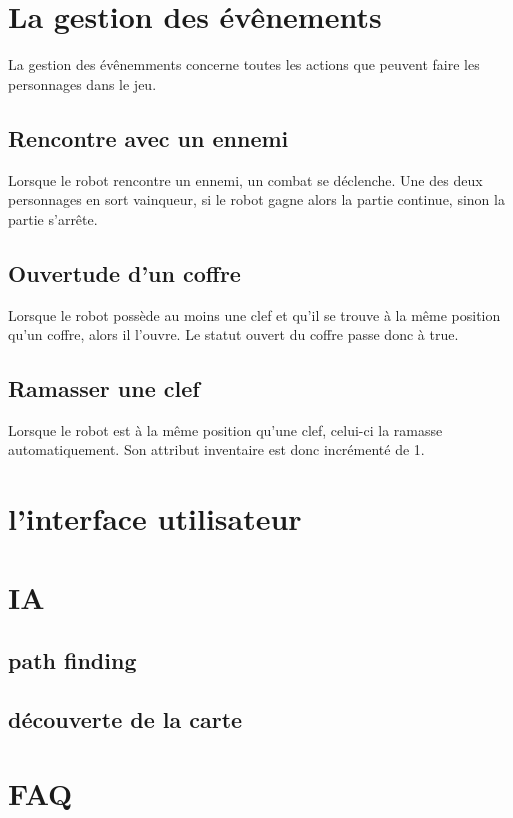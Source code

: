 \documentclass[a4paper 12pts]{article}
\begin{document}
\section{La gestion des évênements}

La gestion des évênemments concerne toutes les actions que peuvent faire les personnages dans le jeu.

\subsection {Rencontre avec un ennemi} 

Lorsque le robot rencontre un ennemi, un combat se déclenche. Une des deux personnages en sort vainqueur, si le robot gagne alors la partie continue, sinon la partie s'arrête.

\subsection {Ouvertude d'un coffre}

Lorsque le robot possède au moins une clef et qu'il se trouve à la même position qu'un coffre, alors il l'ouvre. Le statut ouvert du coffre passe donc à true.

\subsection {Ramasser une clef}

Lorsque le robot est à la même position qu'une clef, celui-ci la ramasse automatiquement. Son attribut inventaire est donc incrémenté de 1.


\section{l'interface utilisateur}

\section{IA}

\subsection{path finding}

\subsection{découverte de la carte}


\section {FAQ}
\end{document}

